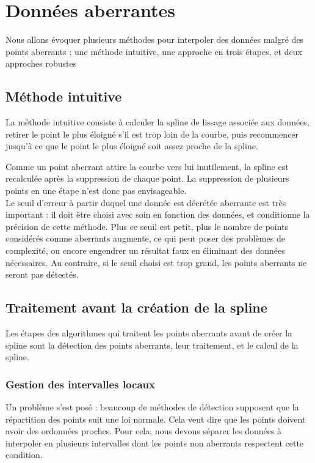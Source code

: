 \documentclass[a4paper,12pt]{article} %
\begin{document}
	\section{Données aberrantes}

        Nous allons évoquer plusieurs méthodes pour interpoler des données malgré des points aberrants : une méthode intuitive, une approche en trois étapes, et deux approches robustes
		\subsection{Méthode intuitive}
			La méthode intuitive consiste à calculer la spline de lissage associée aux données, retirer le point le plus éloigné s'il est trop loin de la courbe, puis recommencer jusqu'à ce que le point le plus éloigné soit assez proche de la spline.
			
			Comme un point aberrant attire la courbe vers lui inutilement, la spline est recalculée après la suppression de chaque point. La suppression de plusieurs points en une étape n'est donc pas envisageable.\\
            
            Le seuil d'erreur à partir duquel une donnée est décrétée aberrante est très important : il doit être choisi avec soin en fonction des données, et conditionne la précision de cette méthode. Plus ce seuil est petit, plus le nombre de points considérés comme aberrants augmente, ce qui peut poser des problèmes de complexité, ou encore engendrer un résultat faux en éliminant des données nécessaires. Au contraire, si le seuil choisi est trop grand, les points aberrants ne seront pas détectés.
                
		\subsection{Traitement avant la création de la spline}
		    Les étapes des algorithmes qui traitent les points aberrants avant de créer la spline sont la détection des points aberrants, leur traitement, et le calcul de la spline.
			  
		    \subsubsection{Gestion des intervalles locaux}  
    			Un problème s'est posé : beaucoup de méthodes de détection supposent que la répartition des points suit une loi normale. Cela veut dire que les points doivent avoir des ordonnées proches. Pour cela, nous devons séparer les données à interpoler en plusieurs intervalles dont les points non aberrants respectent cette condition.
    				
\end{document}
